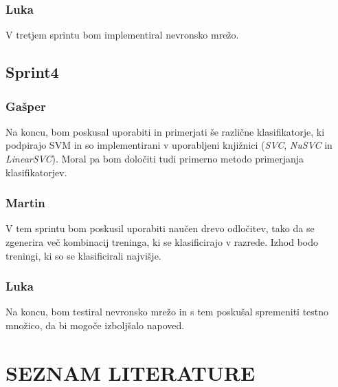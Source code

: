 \documentclass[a4paper,11pt]{article}
\begin{document}
\subsubsection{Luka}
V tretjem sprintu bom implementiral nevronsko mrežo.

\subsection{Sprint4}
\subsubsection{Gašper}
Na koncu, bom poskusal uporabiti in primerjati še različne klasifikatorje, ki podpirajo SVM in so implementirani v uporabljeni knjižnici (\textit{SVC}, \textit{NuSVC} in \textit{LinearSVC}). Moral pa bom določiti tudi primerno metodo primerjanja klasifikatorjev.
\subsubsection{Martin}
V tem sprintu bom poskusil uporabiti naučen drevo odločitev, tako da se zgenerira več kombinacij treninga, ki se klasificirajo v razrede. Izhod bodo treningi, ki so se klasificirali najvišje.

\subsubsection{Luka}
Na koncu, bom testiral nevronsko mrežo in s tem poskušal spremeniti testno množico, da bi mogoče izboljšalo napoved.

\newpage
\section{SEZNAM LITERATURE}{\baselineskip=-8pt}
\vspace{-36pt}
\renewcommand{\refname}{}
\nocite{*}

\end{document}
